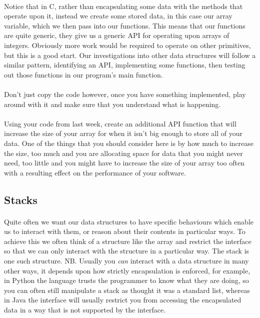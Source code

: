 \documentclass[10pt, a4paper, twosize]{article}
\begin{document}
\paragraph{} Notice that in C, rather than encapsulating some data with the methods that operate upon it, instead we create some stored data, in this case our array variable, which we then pass into our functions. This means that our functions are quite generic, they give us a generic API for operating upon arrays of integers. Obviously more work would be required to operate on other primitives, but this is a good start. Our investigations into other data structures will follow a similar pattern, identifying an API, implementing some functions, then testing out those functions in our program's main function.

\paragraph{} Don't just copy the code however, once you have something implemented, play around with it and make sure that you understand what is happening.

\paragraph{} Using your code from last week, create an additional API function that will increase the size of your array for when it isn't big enough to store all of your data. One of the things that you should consider here is by how much to increase the size, too much and you are allocating space for data that you might never need, too little and you might have to increase the size of your array too often with a resulting effect on the performance of your software.

\subsection{Stacks}
\paragraph{} Quite often we want our data structures to have specific behaviours which enable us to interact with them, or reason about their contents in particular ways. To achieve this we often think of a structure like the array and restrict the interface so that we can only interact with the structure in a particular way. The stack is one such structure. NB. Usually you \emph{can} interact with a data structure in many other ways, it depends upon how strictly encapsulation is enforced, for example, in Python the language trusts the programmer to know what they are doing, so you can often still manipulate a stack as thought it was a standard list, whereas in Java the interface will usually restrict you from accessing the encapsulated data in a way that is not supported by the interface.
\end{document}
